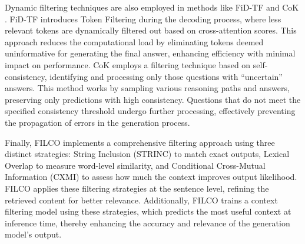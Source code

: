 Dynamic filtering techniques are also employed in methods like FiD-TF \cite{berchansky2023optimizing} and CoK \cite{li2024chainofknowledge}. FiD-TF introduces Token Filtering during the decoding process, where less relevant tokens are dynamically filtered out based on cross-attention scores. This approach reduces the computational load by eliminating tokens deemed uninformative for generating the final answer, enhancing efficiency with minimal impact on performance. CoK employs a filtering technique based on self-consistency, identifying and processing only those questions with ``uncertain'' answers. This method works by sampling various reasoning paths and answers, preserving only predictions with high consistency. Questions that do not meet the specified consistency threshold undergo further processing, effectively preventing the propagation of errors in the generation process.

Finally, FILCO \cite{wang2023learning} implements a comprehensive filtering approach using three distinct strategies: String Inclusion (STRINC) to match exact outputs, Lexical Overlap to measure word-level similarity, and Conditional Cross-Mutual Information (CXMI) to assess how much the context improves output likelihood. FILCO applies these filtering strategies at the sentence level, refining the retrieved content for better relevance. Additionally, FILCO trains a context filtering model using these strategies, which predicts the most useful context at inference time, thereby enhancing the accuracy and relevance of the generation model's output.
